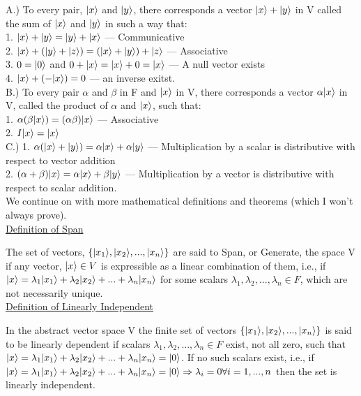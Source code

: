 A.) To every pair, $|x\rangle$ and $|y\rangle$, there corresponds a vector $|x\rangle + |y\rangle$ in V 
called the sum of $|x\rangle$
and $|y\rangle$ in such a way that:\\

1. $|x\rangle + |y\rangle = |y\rangle + |x\rangle$ 		--- Communicative\\
2. $|x\rangle + (|y\rangle + |z\rangle) = (|x\rangle + |y\rangle) + |z\rangle$ --- Associative\\
3. $0 = |0\rangle$ and $0 + |x\rangle = |x\rangle + 0 = |x\rangle$	--- A null vector exists\\
4. $|x\rangle + (-|x\rangle) = 0$			--- an inverse exitst.\\

B.) To every pair $\alpha$ and $\beta$ in F and $|x\rangle$ in V, there corresponds a vector $\alpha|x\rangle$ in V, 
called the product of $\alpha$ and $|x\rangle$, such that:\\

1. $\alpha(\beta|x\rangle) = (\alpha\beta)|x\rangle$ --- Associative\\
2. $I|x\rangle = |x\rangle$\\ 

C.) 1. $\alpha(|x\rangle + |y\rangle) = \alpha|x\rangle +\alpha|y\rangle $ --- Multiplication by a scalar 
is distributive with respect to vector addition\\

2. $(\alpha + \beta)|x\rangle = \alpha|x\rangle + \beta|y\rangle$ --- Multiplication by a vector is distributive with 
respect to scalar addition. \\

We continue on with more mathematical definitions and theorems (which I won't always prove).\\

\underline{Definition of Span}

The set of vectors, $\{|x_1\rangle,|x_2\rangle,...,|x_n\rangle\}$ are said to Span, or Generate, the space V if any vector,
$|x\rangle \in V$ is expressible as a linear combination of them, i.e., if $|x\rangle = \lambda_1|x_1\rangle + 
\lambda_2|x_2\rangle +...+ \lambda_n|x_n\rangle$ for some scalars $\lambda_1, \lambda_2,...,\lambda_n \in F$, which are
not necessarily unique.\\

\underline{Definition of Linearly Independent}

In the abstract vector space V the finite set of vectors $\{|x_1\rangle,|x_2\rangle,...,|x_n\rangle\}$ is said to be 
linearly dependent if scalars $\lambda_1, \lambda_2,...,\lambda_n \in F$ exist, not all zero, such that
$|x\rangle = \lambda_1|x_1\rangle + \lambda_2|x_2\rangle +...+ \lambda_n|x_n\rangle = |0\rangle$. If no such scalars exist, 
i.e., if $|x\rangle = \lambda_1|x_1\rangle + \lambda_2|x_2\rangle +...+ \lambda_n|x_n\rangle = |0\rangle \Rightarrow 
\lambda_i = 0 \forall i = 1, ..., n$ then the set is linearly independent.\\

